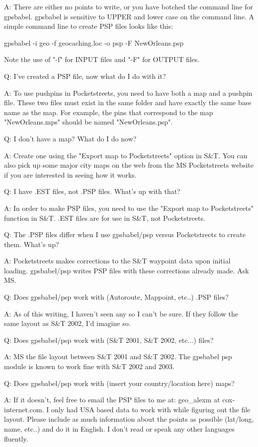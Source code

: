 \documentclass[12pt]{article}
\begin{document}
A: There are either no points to write, or you have botched the command
   line for gpsbabel.  gpsbabel is sensitive to UPPER and lower case 
   on the command line.  A simple command line to create PSP files
   looks like this:

   gpsbabel -i geo -f geocaching.loc -o psp -F NewOrleans.psp

   Note the use of "-f" for INPUT files and "-F" for OUTPUT files.
    

Q: I've created a PSP file, now what do I do with it?

A: To use pushpins in Pocketstreets, you need to have both a map and a
   pushpin file.  These two files must exist in the same folder and have
   exactly the same base name as the map.  For example, the pins that 
   correspond to the map "NewOrleans.mps" should be named "NewOrleans.psp".  


Q: I don't have a map?  What do I do now?

A: Create one using the "Export map to Pocketstreets" option in S\&T.  You
   can also pick up some major city maps on the web from the MS Pocketstreets
   website if you are interested in seeing how it works.


Q: I have .EST files, not .PSP files.  What's up with that?

A: In order to make PSP files, you need to use the "Export map to 
   Pocketstreets" function in S\&T.  .EST files are for use in S\&T, not 
   Pocketstreets.


Q: The .PSP files differ when I use gpsbabel/psp versus Pocketstreets to 
   create them.  What's up?

A: Pocketstreets makes corrections to the S\&T waypoint data upon initial 
   loading. gpsbabel/psp writes PSP files with these corrections already made.
   Ask MS.


Q: Does gpsbabel/psp work with (Autoroute, Mappoint, etc..) .PSP files?

A: As of this writing, I haven't seen any so I can't be sure.  If they 
   follow the same layout as S\&T 2002, I'd imagine so.


Q: Does gpsbabel/psp work with (S\&T 2001, S\&T 2002, etc...) files?

A: MS the file layout between S\&T 2001 and S\&T 2002.  The gpsbabel psp
   module is known to work fine with S\&T 2002 and 2003.


Q: Does gpsbabel/psp work with (insert your country/location here) maps?

A: If it doesn't, feel free to email the PSP files to me at:
   geo\_alexm at cox-internet.com.  I only had USA based data to work 
   with while figuring out the file layout.  Please include as much 
   information about the points as possible (lat/long, name, etc..)
   and do it in English.  I don't read or speak any other languages
   fluently.
\end{document}
